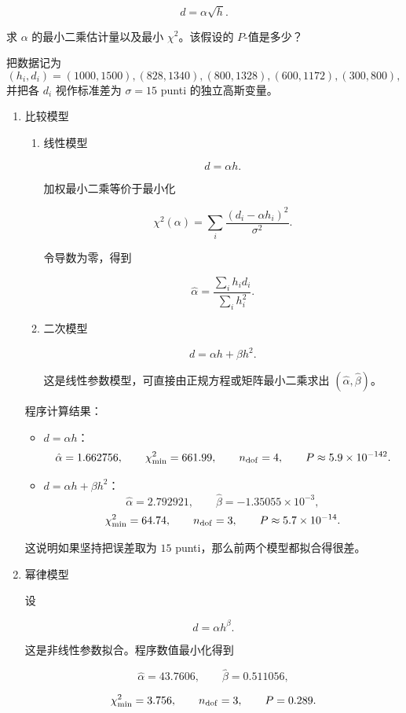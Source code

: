 \begin{question}
\[
d=\alpha\sqrt{h}.
\]

求 \(\alpha\) 的最小二乘估计量以及最小 \(\chi^2\)。该假设的
\(P\)-值是多少？
\begin{solution}
把数据记为
\[
(h_i,d_i)=(1000,1500),(828,1340),(800,1328),(600,1172),(300,800),
\]
并把各 \(d_i\) 视作标准差为 \(\sigma=15\) punti 的独立高斯变量。

\begin{enumerate}
\item 比较模型

\begin{enumerate}
\item
  线性模型

  \[
  d=\alpha h.
  \]

  加权最小二乘等价于最小化

  \[
  \chi^2(\alpha)=\sum_i\frac{(d_i-\alpha h_i)^2}{\sigma^2}.
  \]

  令导数为零，得到

  \[
  \hat\alpha=\frac{\sum_i h_i d_i}{\sum_i h_i^2}.
  \]
\item
  二次模型

  \[
  d=\alpha h+\beta h^2.
  \]

  这是线性参数模型，可直接由正规方程或矩阵最小二乘求出
  \((\hat\alpha,\hat\beta)\)。
\end{enumerate}

程序计算结果：

\begin{itemize}
\item
  \(d=\alpha h\)： \[
  \hat\alpha=1.662756,
  \qquad
  \chi^2_{\min}=661.99,
  \qquad
  n_{\rm dof}=4,
  \qquad
  P\approx5.9\times10^{-142}.
  \]
\item
  \(d=\alpha h+\beta h^2\)： \[
  \hat\alpha=2.792921,
  \qquad
  \hat\beta=-1.35055\times10^{-3},
  \] \[
  \chi^2_{\min}=64.74,
  \qquad
  n_{\rm dof}=3,
  \qquad
  P\approx5.7\times10^{-14}.
  \]
\end{itemize}

这说明如果坚持把误差取为 \(15\) punti，那么前两个模型都拟合得很差。

\item 幂律模型

设

\[
d=\alpha h^\beta.
\]

这是非线性参数拟合。程序数值最小化得到

\[
\hat\alpha=43.7606,
\qquad
\hat\beta=0.511056,
\]

\[
\chi^2_{\min}=3.756,
\qquad
n_{\rm dof}=3,
\qquad
P=0.289.
\]


\end{enumerate}
\end{solution}
\end{question}
